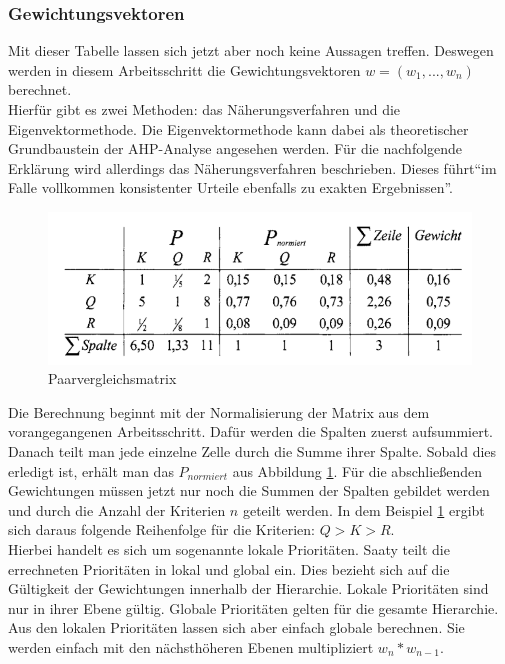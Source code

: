 \subsubsection{Gewichtungsvektoren}
Mit dieser Tabelle lassen sich jetzt aber noch keine Aussagen treffen. Deswegen werden in diesem Arbeitsschritt die Gewichtungsvektoren $w=(w_{1}, ..., w_{n})$ berechnet.\\
Hierfür gibt es zwei Methoden: das Näherungsverfahren und die Eigenvektormethode. Die Eigenvektormethode kann dabei als theoretischer Grundbaustein der AHP-Analyse angesehen werden.\autocite[Vgl.][S.106]{Fink.2006} Für die nachfolgende Erklärung wird allerdings das Näherungsverfahren beschrieben. Dieses führt\enquote{im Falle vollkommen konsistenter Urteile ebenfalls zu exakten Ergebnissen}\autocite[S.106]{Fink.2006}.
\begin{figure}[h!]
	\centering
	\includegraphics[scale = 0.9]{img/Tabelle.png}
	\caption{Paarvergleichsmatrix}
	\label{img:table}
\end{figure}
Die Berechnung beginnt mit der Normalisierung der Matrix aus dem vorangegangenen Arbeitsschritt. Dafür werden die Spalten zuerst aufsummiert. Danach teilt man jede einzelne Zelle durch die Summe ihrer Spalte. Sobald dies erledigt ist, erhält man das $P_{normiert}$ aus Abbildung \ref{img:table}. Für die abschließenden Gewichtungen müssen jetzt nur noch die Summen der Spalten gebildet werden und durch die Anzahl der Kriterien $n$ geteilt werden. In dem Beispiel \ref{img:table} ergibt sich daraus folgende Reihenfolge für die Kriterien: $Q > K > R$. \\
Hierbei handelt es sich um sogenannte lokale Prioritäten. Saaty teilt die errechneten Prioritäten in lokal und global ein.\autocite[Vgl.][S.16]{Saaty.2012} Dies bezieht sich auf die Gültigkeit der Gewichtungen innerhalb der Hierarchie. Lokale Prioritäten sind nur in ihrer Ebene gültig. Globale Prioritäten gelten für die gesamte Hierarchie. Aus den lokalen Prioritäten lassen sich aber einfach globale berechnen. Sie werden einfach mit den nächsthöheren Ebenen multipliziert $w_n * w_{n-1}$\autocite[Vgl.][S.107]{Fink.2006}. 
